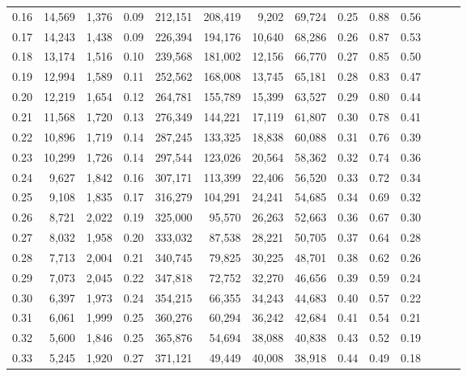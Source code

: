 \begin{tabular}{rrrrrrrrrrrrrr}
0.16 &  14,569 &  1,376 &  0.09 &  212,151 &  208,419 &   9,202 &  69,724 &  0.25 &  0.88 &      0.56 \\
0.17 &  14,243 &  1,438 &  0.09 &  226,394 &  194,176 &  10,640 &  68,286 &  0.26 &  0.87 &      0.53 \\
0.18 &  13,174 &  1,516 &  0.10 &  239,568 &  181,002 &  12,156 &  66,770 &  0.27 &  0.85 &      0.50 \\
0.19 &  12,994 &  1,589 &  0.11 &  252,562 &  168,008 &  13,745 &  65,181 &  0.28 &  0.83 &      0.47 \\
0.20 &  12,219 &  1,654 &  0.12 &  264,781 &  155,789 &  15,399 &  63,527 &  0.29 &  0.80 &      0.44 \\
0.21 &  11,568 &  1,720 &  0.13 &  276,349 &  144,221 &  17,119 &  61,807 &  0.30 &  0.78 &      0.41 \\
0.22 &  10,896 &  1,719 &  0.14 &  287,245 &  133,325 &  18,838 &  60,088 &  0.31 &  0.76 &      0.39 \\
0.23 &  10,299 &  1,726 &  0.14 &  297,544 &  123,026 &  20,564 &  58,362 &  0.32 &  0.74 &      0.36 \\
0.24 &   9,627 &  1,842 &  0.16 &  307,171 &  113,399 &  22,406 &  56,520 &  0.33 &  0.72 &      0.34 \\
0.25 &   9,108 &  1,835 &  0.17 &  316,279 &  104,291 &  24,241 &  54,685 &  0.34 &  0.69 &      0.32 \\
0.26 &   8,721 &  2,022 &  0.19 &  325,000 &   95,570 &  26,263 &  52,663 &  0.36 &  0.67 &      0.30 \\
0.27 &   8,032 &  1,958 &  0.20 &  333,032 &   87,538 &  28,221 &  50,705 &  0.37 &  0.64 &      0.28 \\
0.28 &   7,713 &  2,004 &  0.21 &  340,745 &   79,825 &  30,225 &  48,701 &  0.38 &  0.62 &      0.26 \\
0.29 &   7,073 &  2,045 &  0.22 &  347,818 &   72,752 &  32,270 &  46,656 &  0.39 &  0.59 &      0.24 \\
0.30 &   6,397 &  1,973 &  0.24 &  354,215 &   66,355 &  34,243 &  44,683 &  0.40 &  0.57 &      0.22 \\
0.31 &   6,061 &  1,999 &  0.25 &  360,276 &   60,294 &  36,242 &  42,684 &  0.41 &  0.54 &      0.21 \\
0.32 &   5,600 &  1,846 &  0.25 &  365,876 &   54,694 &  38,088 &  40,838 &  0.43 &  0.52 &      0.19 \\
0.33 &   5,245 &  1,920 &  0.27 &  371,121 &   49,449 &  40,008 &  38,918 &  0.44 &  0.49 &      0.18 \\

\end{tabular}
